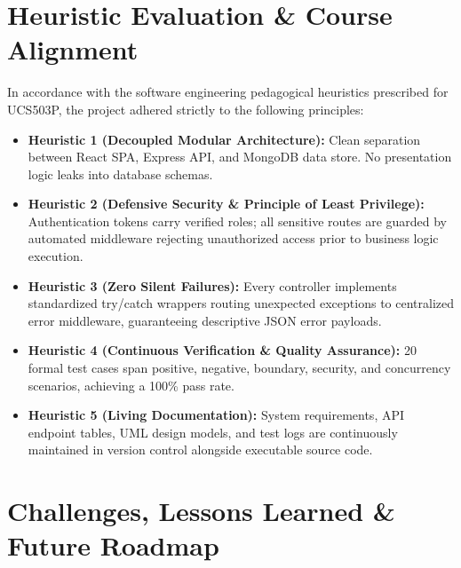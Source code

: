 \documentclass[11pt,a4paper]{article}
\begin{document}
\section{Heuristic Evaluation \& Course Alignment}
In accordance with the software engineering pedagogical heuristics prescribed for UCS503P, the project adhered strictly to the following principles:
\begin{itemize}[leftmargin=1.4em, itemsep=0.2em]
  \item \textbf{Heuristic 1 (Decoupled Modular Architecture):} Clean separation between React SPA, Express API, and MongoDB data store. No presentation logic leaks into database schemas.
  \item \textbf{Heuristic 2 (Defensive Security \& Principle of Least Privilege):} Authentication tokens carry verified roles; all sensitive routes are guarded by automated middleware rejecting unauthorized access prior to business logic execution.
  \item \textbf{Heuristic 3 (Zero Silent Failures):} Every controller implements standardized try/catch wrappers routing unexpected exceptions to centralized error middleware, guaranteeing descriptive JSON error payloads.
  \item \textbf{Heuristic 4 (Continuous Verification \& Quality Assurance):} 20 formal test cases span positive, negative, boundary, security, and concurrency scenarios, achieving a 100\% pass rate.
  \item \textbf{Heuristic 5 (Living Documentation):} System requirements, API endpoint tables, UML design models, and test logs are continuously maintained in version control alongside executable source code.
\end{itemize}

\section{Challenges, Lessons Learned \& Future Roadmap}
\end{document}
